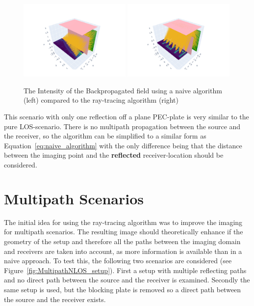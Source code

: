 \begin{figure}[ht]
    \centering
    \includegraphics[width=0.49\textwidth]{figures/nlos_naive_result.pdf}
    \includegraphics[width=0.49\textwidth]{figures/nlos_result.pdf}
    \caption{The Intensity of the Backpropagated field using a naive algorithm (left) compared to the ray-tracing algorithm (right)}\label{fig:nlos_results}
\end{figure}

This scenario with only one reflection off a plane PEC-plate is very similar to the pure LOS-scenario.
There is no multipath propagation between the source and the receiver, so the algorithm can be simplified to a similar form as Equation~\eqref{eq:naive_algorithm} with the only difference being that the distance between the imaging point and the \textbf{reflected} receiver-location should be considered.



\section{Multipath Scenarios}
The initial idea for using the ray-tracing algorithm was to improve the imaging for multipath scenarios.
The resulting image should theoretically enhance if the geometry of the setup and therefore all the paths between the imaging domain and receivers are taken into account, as more information is available than in a naive approach.
To test this, the following two scenarios are considered (see Figure~\ref{fig:MultipathNLOS_setup}).
First a setup with multiple reflecting paths and no direct path between the source and the receiver is examined.
Secondly the same setup is used, but the blocking plate is removed so a direct path between the source and the receiver exists.

